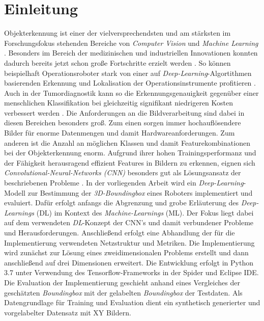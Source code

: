 \section{Einleitung}

Objekterkennung ist einer der vielversprechendsten und am stärksten im Forschungsfokus stehenden Bereiche von \textit{Computer Vision} und \textit{Machine Learning} \cite{Ouyang2014}. Besonders im Bereich der medizinischen und industriellen Innovationen konnten dadurch bereits jetzt schon große Fortschritte erzielt werden  \cite{Tremblay1809, Abstract2016}. So können beispielhaft Operationsroboter stark von einer auf \textit{Deep-Learning}-Algortithmen basierenden Erkennung und Lokalisation der Operationsinstrumente profitieren \cite{Surgery1803}. Auch in der Tumordiagnostik kann so die Erkennungsgenauigkeit gegenüber einer menschlichen Klassifikation bei gleichzeitig signifikant niedrigeren Kosten verbessert werden \cite{Cruz-Roa2017}.\newline
Die Anforderungen an die Bildverarbeitung sind dabei in diesen Bereichen besonders groß. Zum einen sorgen immer hochauflösendere Bilder für enorme Datenmengen und damit Hardwareanforderungen. Zum anderen ist die Anzahl an möglichen Klassen und damit Featurekombinationen bei der Objekterkennung enorm. Aufgrund ihrer hohen Trainingsperformanz und der Fähigkeit herausragend effizient Features in Bildern zu erkennen, eignen sich \textit{Convolutional-Neural-Networks (CNN)} besonders gut als Lösungsansatz der beschriebenen Probleme \cite{Ouyang2014}.\newline
In der vorliegenden Arbeit wird ein \textit{Deep-Learning}-Modell zur Bestimmung der \textit{3D-Boundingbox} eines Roboters implementiert und evaluiert.  Dafür erfolgt anfangs die Abgrenzung und grobe Erläuterung des \textit{Deep-Learnings} (DL) im Kontext des \textit{Machine-Learnings} (ML). Der Fokus liegt dabei auf dem verwendeten \textit{DL}-Konzept der CNN's und damit verbundener Probleme und Herausforderungen. Anschließend erfolgt eine Abhandlung der für die Implementierung verwendeten Netzstruktur und Metriken. Die Implementierung wird zunächst zur Lösung eines zweidimensionalen Problems erstellt und dann anschließend auf drei Dimensionen erweitert. Die Entwicklung erfolgt in Python 3.7 unter Verwendung des Tensorflow-Frameworks in der Spider und Eclipse IDE. Die Evaluation der Implementierung geschieht anhand eines Vergleiches der geschätzten \textit{Boundingbox} mit der gelabelten \textit{Boundingbox} der Testdaten. Als Datengrundlage für Training und Evaluation dient ein synthetisch generierter und vorgelabelter Datensatz mit XY Bildern.   